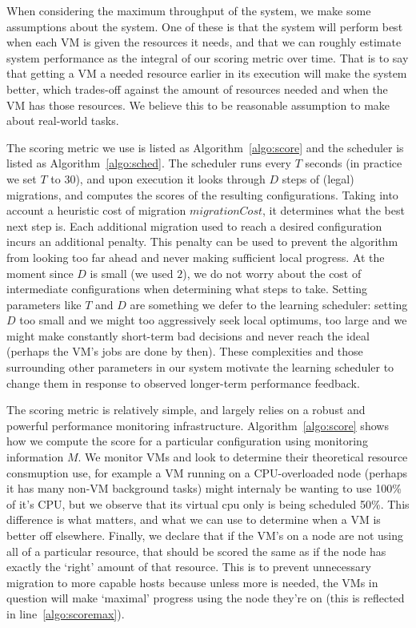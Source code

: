 When considering the maximum throughput of the system, we make some assumptions
about the system.  One of these is that the system will perform best when each
VM is given the resources it needs, and that we can roughly estimate
system performance as the integral of our scoring metric over time.  That is to
say that getting a VM a needed resource earlier in its execution will
make the system better, which trades-off against the amount of resources
needed and when the VM has those resources.  We believe this to be reasonable assumption to make
about real-world tasks.



The scoring metric we use is listed as Algorithm~\ref{algo:score} and the scheduler is
listed as Algorithm~\ref{algo:sched}.  The scheduler runs every $T$ seconds (in
practice we set $T$ to 30), and upon execution it looks through $D$ steps of
(legal) migrations, and computes the scores of the resulting configurations.
Taking into account a heuristic cost of migration $migrationCost$, it determines
what the best next step is.  Each additional migration used to reach a desired
configuration incurs an additional penalty.   This penalty can be used to
prevent the algorithm from looking too far ahead and never making sufficient
local progress.  At the moment since $D$ is small (we used $2$), we do not worry
about the cost of intermediate configurations when determining what steps to
take.  Setting parameters like $T$ and $D$ are something we defer to the
learning scheduler: setting $D$ too small and we might too aggressively seek
local optimums, too large and we might make constantly short-term bad decisions
and never reach the ideal (perhaps the VM's jobs are done by then).  These
complexities and those surrounding other parameters in our system motivate the
learning scheduler to change them in response to observed longer-term
performance feedback.

The scoring metric is relatively simple, and largely relies on a robust and
powerful performance monitoring infrastructure.  Algorithm~\ref{algo:score}
shows how we compute the score for a particular configuration using monitoring
information $M$.  We monitor VMs and look to determine their theoretical
resource consmuption use, for example a VM running on a CPU-overloaded
node (perhaps it has many non-VM background tasks) might internaly be wanting to
use 100\% of it's CPU, but we observe that its virtual cpu only is being
scheduled 50\%.  This difference is what matters, and what we can use to
determine when a VM is better off elsewhere.  Finally, we declare
that if the VM's on a node are not using all of a particular resource, that
should be scored the same as if the node has exactly the `right' amount of that
resource.  This is to prevent unnecessary migration to more capable hosts
because unless more is needed, the VMs in question will make `maximal'
progress using the node they're on (this is reflected in
line~\ref{algo:scoremax}).

